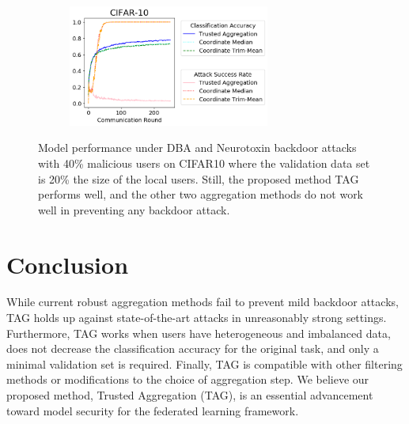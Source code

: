 \documentclass{article} %
\begin{document}
\begin{figure}[htp]
\centering
  \begin{subfigure}{.35\textwidth}
  \centering
  \end{subfigure}%
  ~
  \begin{subfigure}{.65\textwidth}
  \centering
    \includegraphics[height=4cm, left]{make_article/make_visuals/visuals/accuracy--cifar_10--n_malicious4--dba1--beta0.2--neuro_p0.1--n_val_data100.png}
  \end{subfigure}%
\caption{\footnotesize Model performance under DBA and Neurotoxin backdoor attacks with 40\% malicious users on CIFAR10 where the validation data set is 20\% the size of the local users. Still, the proposed method TAG performs well, and the other two aggregation methods do not work well in preventing any backdoor attack.}
\label{fig: accuracy--n_malicious4--n_val_data100}
\end{figure}


% 
\section{Conclusion}

While current robust aggregation methods fail to prevent mild backdoor attacks, TAG holds up against state-of-the-art attacks in unreasonably strong settings. Furthermore, TAG works when users have heterogeneous and imbalanced data, does not decrease the classification accuracy for the original task, and only a minimal validation set is required. Finally, TAG is compatible with other filtering methods or modifications to the choice of aggregation step. We believe our proposed method, Trusted Aggregation (TAG), is an essential advancement toward model security for the federated learning framework.

\newpage
{  \small 


}


%
\pagebreak\appendix
\end{document}
